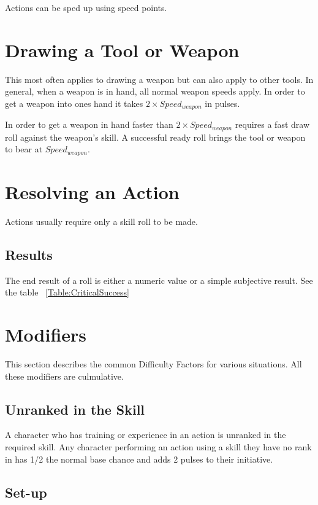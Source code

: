 Actions can be sped up using speed points. 


\section{Drawing a Tool or Weapon}


This most often applies to drawing a weapon but can also apply to 
other tools. In general, when a weapon is in hand, all normal weapon 
speeds apply. In order to get a weapon into ones hand it takes 
\( 2 \times Speed_{weapon} \) in pulses. 

In order to get a weapon in hand faster than \( 2 \times 
Speed_{weapon} \) requires a fast draw roll against the weapon's 
skill. A successful ready roll brings the tool or weapon to bear at
\( Speed_{weapon} \).


\section{Resolving an Action}

Actions usually require only a skill roll to be made. 

\subsection{Results}

The end result of a roll is either a numeric value or a simple 
subjective result. See the table ~\ref{Table:CriticalSuccess}

\section{Modifiers} 

This section describes the common Difficulty Factors for various 
situations. All these modifiers are culmulative.

\subsection{Unranked in the Skill}

A character who has training or experience in an action is
unranked in the required skill. Any character performing an action using 
a skill they have no rank in has 1/2 the normal base chance and adds 2 pulses to 
their initiative. 

\subsection{{Set-up}}

